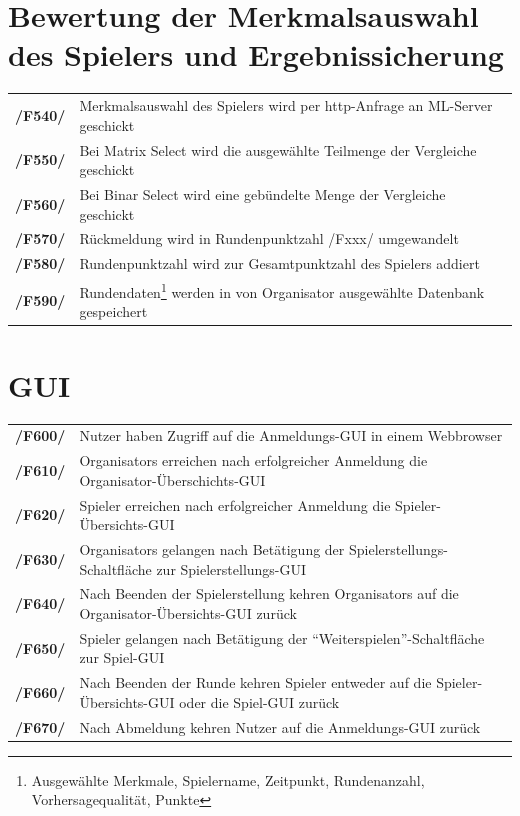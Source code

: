 \documentclass[a4paper]{scrreprt}
\begin{document}
    \section{Bewertung der Merkmalsauswahl des Spielers und Ergebnissicherung}
    \begin{tabularx}{\linewidth}{@{}>{\bfseries}l@{\hspace{.5em}}X@{}} %
    /F540/ & Merkmalsauswahl des \Gls{Spieler}s wird per http-Anfrage an ML-Server geschickt \\
    /F550/ & Bei \Gls{Matrix Select} wird die ausgewählte Teilmenge der Vergleiche geschickt \\
    /F560/ & Bei \Gls{Binar Select} wird eine gebündelte Menge der Vergleiche geschickt \\
    /F570/ & Rückmeldung wird in Rundenpunktzahl /Fxxx/ umgewandelt \\ %
    /F580/ & Rundenpunktzahl wird zur Gesamtpunktzahl des \Gls{Spieler}s addiert \\
    /F590/ & Rundendaten\footnote{Ausgewählte Merkmale, Spielername, Zeitpunkt, Rundenanzahl, Vorhersagequalität, Punkte} werden in von Organisator ausgewählte Datenbank gespeichert \\ %
    \end{tabularx}
    
    \section{GUI}
    \begin{tabularx}{\linewidth}{@{}>{\bfseries}l@{\hspace{.5em}}X@{}} %
    /F600/ & Nutzer haben Zugriff auf die Anmeldungs-GUI in einem \Gls{Webbrowser} \\
    /F610/ & \Glspl{Organisator} erreichen nach erfolgreicher Anmeldung die Organisator-Überschichts-GUI \\
    /F620/ & \Gls{Spieler} erreichen nach erfolgreicher Anmeldung die Spieler-Übersichts-GUI \\
    /F630/ & \Glspl{Organisator} gelangen nach Betätigung der Spielerstellungs-Schaltfläche zur Spielerstellungs-GUI \\
    /F640/ & Nach Beenden der Spielerstellung kehren \Glspl{Organisator} auf die Organisator-Übersichts-GUI zurück \\
    /F650/ & \Gls{Spieler} gelangen nach Betätigung der \enquote{Weiterspielen}-Schaltfläche zur Spiel-GUI \\
    /F660/ & Nach Beenden der Runde kehren \Gls{Spieler} entweder auf die Spieler-Übersichts-GUI oder die Spiel-GUI zurück \\
    /F670/ & Nach Abmeldung kehren Nutzer auf die Anmeldungs-GUI zurück \\
    \end{tabularx}
        
\end{document}
